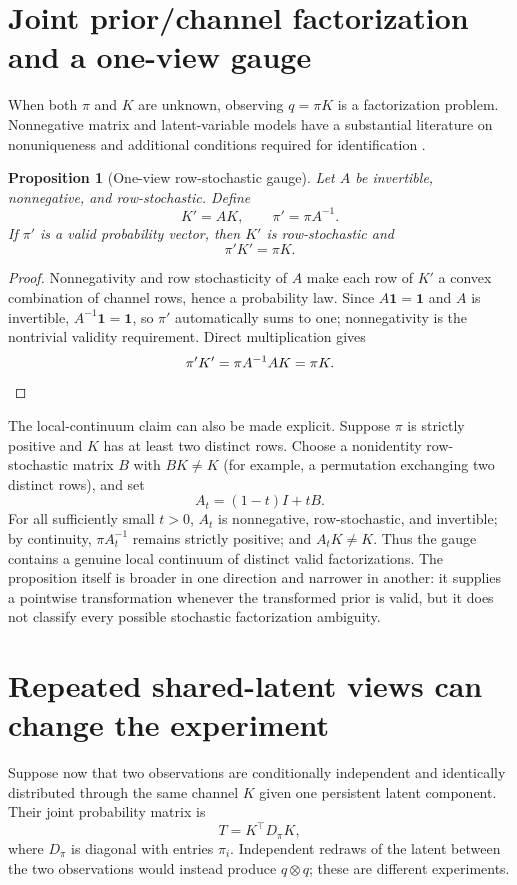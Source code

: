 \documentclass[11pt]{article}
\newtheorem{proposition}{Proposition}
\begin{document}
\section{Joint prior/channel factorization and a one-view gauge}
When both $\pi$ and $K$ are unknown, observing $q=\pi K$ is a factorization problem. Nonnegative matrix and latent-variable models have a substantial literature on nonuniqueness and additional conditions required for identification \citep{allman2009,gillis2020}.

\begin{proposition}[One-view row-stochastic gauge]\label{prop:gauge}
Let $A$ be invertible, nonnegative, and row-stochastic. Define
\[
K'=AK,\qquad \pi'=\pi A^{-1}.
\]
If $\pi'$ is a valid probability vector, then $K'$ is row-stochastic and
\[
\pi'K'=\pi K.
\]
\end{proposition}

\begin{proof}
Nonnegativity and row stochasticity of $A$ make each row of $K'$ a convex combination of channel rows, hence a probability law. Since $A\mathbf 1=\mathbf 1$ and $A$ is invertible, $A^{-1}\mathbf 1=\mathbf 1$, so $\pi'$ automatically sums to one; nonnegativity is the nontrivial validity requirement. Direct multiplication gives
\[
\pi'K'=\pi A^{-1}AK=\pi K. \qedhere
\]
\end{proof}

The local-continuum claim can also be made explicit. Suppose $\pi$ is strictly positive and $K$ has at least two distinct rows. Choose a nonidentity row-stochastic matrix $B$ with $BK\ne K$ (for example, a permutation exchanging two distinct rows), and set
\[
A_t=(1-t)I+tB.
\]
For all sufficiently small $t>0$, $A_t$ is nonnegative, row-stochastic, and invertible; by continuity, $\pi A_t^{-1}$ remains strictly positive; and $A_tK\ne K$. Thus the gauge contains a genuine local continuum of distinct valid factorizations. The proposition itself is broader in one direction and narrower in another: it supplies a pointwise transformation whenever the transformed prior is valid, but it does not classify every possible stochastic factorization ambiguity.

\section{Repeated shared-latent views can change the experiment}
Suppose now that two observations are conditionally independent and identically distributed through the same channel $K$ given one persistent latent component. Their joint probability matrix is
\[
T=K^\top D_\pi K,
\]
where $D_\pi$ is diagonal with entries $\pi_i$. Independent redraws of the latent between the two observations would instead produce $q\otimes q$; these are different experiments.
\end{document}
